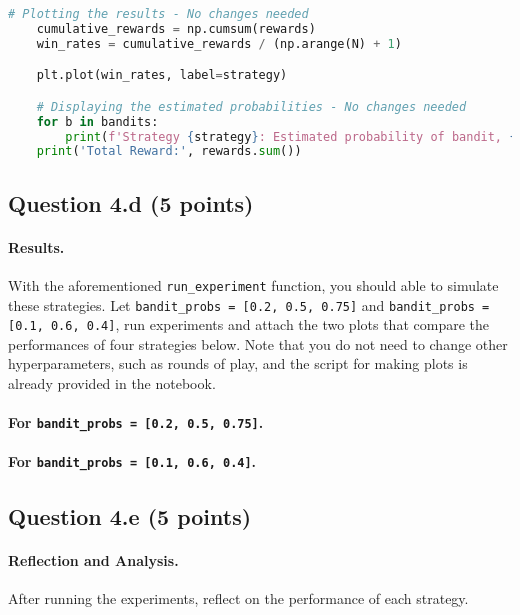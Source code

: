\documentclass[12pt]{article}
\begin{document}
\begin{solution}
\begin{lstlisting}[language=Python]
    # Plotting the results - No changes needed
    cumulative_rewards = np.cumsum(rewards)
    win_rates = cumulative_rewards / (np.arange(N) + 1)

    plt.plot(win_rates, label=strategy)

    # Displaying the estimated probabilities - No changes needed
    for b in bandits:
        print(f'Strategy {strategy}: Estimated probability of bandit, {b.p_estimate}')
    print('Total Reward:', rewards.sum())
\end{lstlisting}
\end{solution}

\subsection*{Question 4.d (5 points) } 
\paragraph{Results.}
With the aforementioned \texttt{run\_experiment} function, you should able to simulate these strategies. Let \texttt{bandit\_probs = [0.2, 0.5, 0.75]} and \texttt{bandit\_probs = [0.1, 0.6, 0.4]}, run experiments and attach the two plots that compare the performances of four strategies below. Note that you do not need to change other hyperparameters, such as rounds of play, and the script for making plots is already provided in the notebook.

\paragraph{For \texttt{bandit\_probs = [0.2, 0.5, 0.75]}.}
\begin{solution}


\end{solution}

\paragraph{For \texttt{bandit\_probs = [0.1, 0.6, 0.4]}.}
\begin{solution}

\end{solution}

\subsection*{Question 4.e (5 points) } 
\paragraph{Reflection and Analysis.}
After running the experiments, reflect on the performance of each strategy.
\begin{solution}

\end{solution}
\end{document}
